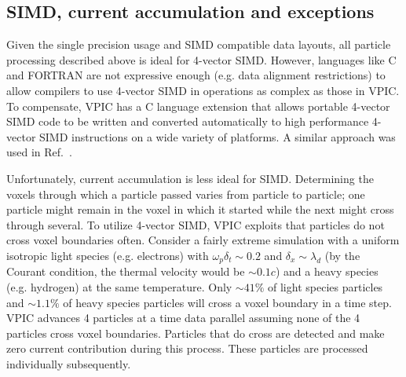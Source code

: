 \documentclass[10pt]{article}
\begin{document}

\subsection{SIMD, current accumulation and exceptions}

Given the single precision usage and SIMD compatible data layouts, all
particle processing described above is ideal for 4-vector SIMD.
However, languages like C and FORTRAN are not expressive enough
(e.g. data alignment restrictions) to allow compilers to use 4-vector
SIMD in operations as complex as those in VPIC.  To compensate, VPIC
has a C language extension that allows portable 4-vector SIMD code to
be written and converted automatically to high performance 4-vector
SIMD instructions on a wide variety of platforms.  A similar approach
was used in Ref.~\cite{Bowers_et_al_2006}.

Unfortunately, current accumulation is less ideal for SIMD.
Determining the voxels through which a particle passed varies from
particle to particle; one particle might remain in the voxel in which
it started while the next might cross through several.  To utilize
4-vector SIMD, VPIC exploits that particles do not cross voxel
boundaries often.  Consider a fairly extreme simulation with a uniform
isotropic light species (e.g. electrons) with $\omega_p \delta_t \sim
0.2$ and $\delta_x \sim \lambda_d$ (by the Courant condition, the
thermal velocity would be $\sim 0.1c$) and a heavy species
(e.g. hydrogen) at the same temperature.  Only $\sim 41\%$ of light
species particles and $\sim 1.1\%$ of heavy species particles will
cross a voxel boundary in a time step.  VPIC advances 4 particles at a
time data parallel assuming none of the 4 particles cross voxel
boundaries.  Particles that do cross are detected and make zero
current contribution during this process.  These particles are
processed individually subsequently.
\end{document}
